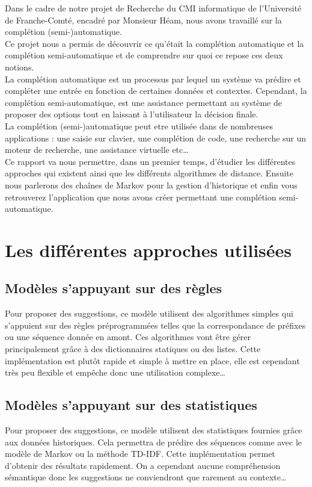 \documentclass[a4paper, 11pt]{report}
\begin{document}
Dans le cadre de notre projet de Recherche du CMI informatique de l’Université de Franche-Comté, encadré par Monsieur Héam, nous avons travaillé sur la complétion (semi-)automatique. \\

Ce projet nous a permis de découvrir ce qu'était la complétion automatique et la complétion semi-automatique et de comprendre sur quoi ce repose ces deux notions. \\ 
La complétion automatique est un processus par lequel un système va prédire et compléter une entrée en fonction de certaines données et contextes. Cependant, la complétion semi-automatique, est une assistance permettant au système de proposer des options tout en laissant à l'utilisateur la décision finale. \\
La complétion (semi-)automatique peut etre utilisée dans de nombreuses applications : une saisie sur clavier, une complétion de code, une recherche sur un moteur de recherche, une assistance virtuelle etc\dots \\
Ce rapport va nous permettre, dans un premier temps, d’étudier les différentes approches qui existent ainsi que  les différents algorithmes de distance. Ensuite nous parlerons  des chaînes de Markov pour la gestion d'historique et enfin vous retrouverez l'application que nous avons créer permettant une complétion semi-automatique. \\
\vfill

\chapter{Les différentes approches utilisées}

\section{Modèles s'appuyant sur des règles}
Pour proposer des suggestions, ce modèle utilisent des algorithmes simples qui s'appuient sur des règles préprogrammées telles que la correspondance de préfixes ou une séquence donnée en amont. Ces algorithmes vont être gérer principalement grâce à des dictionnaires statiques ou des listes.  Cette implémentation est plutôt rapide et simple à mettre en place, elle est cependant très peu flexible et empêche donc une utilisation complexe\dots

\section{Modèles s'appuyant sur des statistiques}
Pour proposer des suggestions, ce modèle utilisent des statistiques fournies grâce aux données historiques. Cela permettra de prédire des séquences comme avec le modèle de Markov ou la méthode TD-IDF.
Cette implémentation permet d'obtenir des résultats rapidement. On a cependant aucune compréhension sémantique donc les suggestions ne conviendront que rarement au contexte\dots
\end{document}
